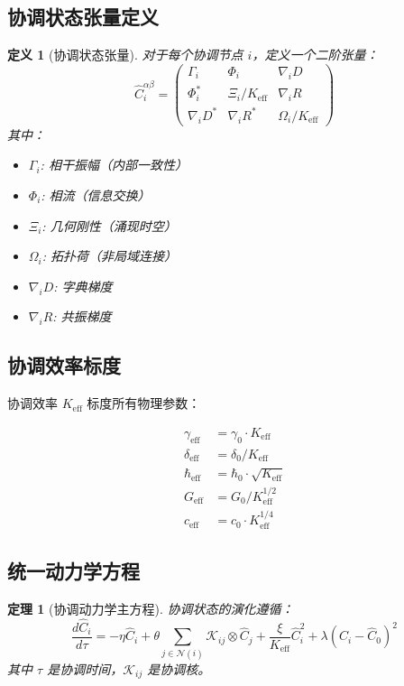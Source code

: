 \documentclass[11pt,a4paper]{article}
\newtheorem{theorem}{定理}
\newtheorem{definition}{定义}
\begin{document}
	\subsection{协调状态张量定义}
	
	\begin{definition}[协调状态张量]
		对于每个协调节点 $i$，定义一个二阶张量：
		\[
		\hat{C}_i^{\alpha\beta} = \begin{pmatrix}
			\Gamma_i & \Phi_i & \nabla_i D \\
			\Phi_i^* & \Xi_i/K_{\mathrm{eff}} & \nabla_i R \\
			\nabla_i D^* & \nabla_i R^* & \Omega_i/K_{\mathrm{eff}}
		\end{pmatrix}
		\]
		其中：
		\begin{itemize}
			\item $\Gamma_i$: 相干振幅（内部一致性）
			\item $\Phi_i$: 相流（信息交换）
			\item $\Xi_i$: 几何刚性（涌现时空）
			\item $\Omega_i$: 拓扑荷（非局域连接）
			\item $\nabla_i D$: 字典梯度
			\item $\nabla_i R$: 共振梯度
		\end{itemize}
	\end{definition}
	
	\subsection{协调效率标度}
	
	协调效率 $K_{\mathrm{eff}}$ 标度所有物理参数：
	
	\[
	\begin{aligned}
		\gamma_{\mathrm{eff}} &= \gamma_0 \cdot K_{\mathrm{eff}} \\
		\delta_{\mathrm{eff}} &= \delta_0 / K_{\mathrm{eff}} \\
		\hbar_{\mathrm{eff}} &= \hbar_0 \cdot \sqrt{K_{\mathrm{eff}}} \\
		G_{\mathrm{eff}} &= G_0 / K_{\mathrm{eff}}^{1/2} \\
		c_{\mathrm{eff}} &= c_0 \cdot K_{\mathrm{eff}}^{1/4}
	\end{aligned}
	\]
	
	\subsection{统一动力学方程}
	
	\begin{theorem}[协调动力学主方程]
		协调状态的演化遵循：
		\[
		\frac{d\hat{C}_i}{d\tau} = -\eta \hat{C}_i + \theta \sum_{j \in \mathcal{N}(i)} \mathcal{K}_{ij} \otimes \hat{C}_j + \frac{\xi}{K_{\mathrm{eff}}} \hat{C}_i^2 + \lambda (\hat{C}_i - \hat{C}_0)^2
		\]
		其中 $\tau$ 是协调时间，$\mathcal{K}_{ij}$ 是协调核。
	\end{theorem}
	
\end{document}
